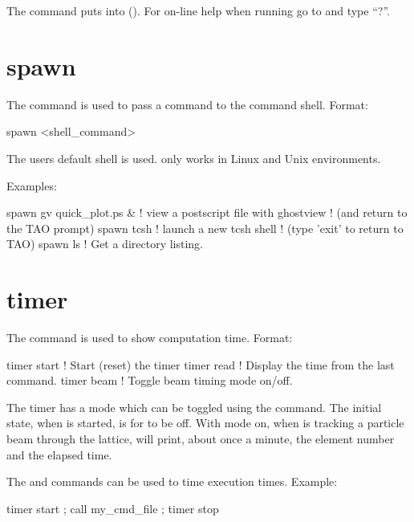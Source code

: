 {{{The  command puts \tao into  ().
For on-line help when running \tao go to  and type ``?''.

\section{spawn}
\label{s:spawn}

The  command is used to pass a command to the command shell. Format:
\begin{example}
  spawn <shell_command>
\end{example}

\vskip 0.2in

The users default shell is used.  only works in Linux and
Unix environments.

Examples:
\begin{example}
  spawn gv quick_plot.ps &      ! view a postscript file with ghostview
                                ! (and return to the TAO prompt)
  spawn tcsh                    ! launch a new tcsh shell 
                                ! (type 'exit' to return to TAO)
  spawn ls                      ! Get a directory listing.
\end{example}

\section{timer}
\label{s:timer}

The  command is used to show computation time. Format:
\begin{example}
  timer start      ! Start (reset) the timer
  timer read       ! Display the time from the last  command.    
  timer beam       ! Toggle beam timing mode on/off.
\end{example}
The timer has a  mode which can be toggled using the
 command. The initial state, when \tao is started, is for
 to be off. With  mode on, when \tao
is tracking a particle beam through the lattice, \tao will print,
about once a minute, the element number and the elapsed time.

The  and  commands can
be used to time execution times. Example:
\begin{example}
  timer start ; call my_cmd_file ; timer stop
\end{example}

}}}
